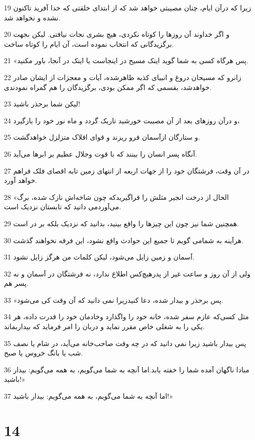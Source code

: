 \par 19 زیرا که درآن ایام، چنان مصیبتی خواهد شد که از ابتدای خلقتی که خدا آفرید تاکنون نشده و نخواهد شد.
\par 20 و اگر خداوند آن روزها را کوتاه نکردی، هیچ بشری نجات نیافتی. لیکن بجهت برگزیدگانی که انتخاب نموده است، آن ایام را کوتاه ساخت.
\par 21 «پس هرگاه کسی به شما گوید اینک مسیح در اینجاست یا اینک در آنجا، باور مکنید.
\par 22 زانرو که مسیحان دروغ و انبیای کذبه ظاهرشده، آیات و معجزات از ایشان صادر خواهدشد، بقسمی که اگر ممکن بودی، برگزیدگان را هم گمراه نمودندی.
\par 23 لیکن شما برحذر باشید!
\par 24 و درآن روزهای بعد از آن مصیبت خورشید تاریک گردد و ماه نور خود را بازگیرد،
\par 25 و ستارگان ازآسمان فرو ریزند و قوای افلاک متزلزل خواهدگشت.
\par 26 آنگاه پسر انسان را بینند که با قوت وجلال عظیم بر ابرها می‌آید.
\par 27 در آن وقت، فرشتگان خود را از جهات اربعه از انتهای زمین تابه اقصای فلک فراهم خواهد آورد.
\par 28 «الحال از درخت انجیر مثلش را فراگیریدکه چون شاخه‌اش نازک شده، برگ می‌آوردمی دانید که تابستان نزدیک است.
\par 29 همچنین شما نیز چون این چیزها را واقع بینید، بدانید که نزدیک بلکه بر در است.
\par 30 هرآینه به شمامی گویم تا جمیع این حوادث واقع نشود، این فرقه نخواهند گذشت.
\par 31 آسمان و زمین زایل می‌شود، لیکن کلمات من هرگز زایل نشود.
\par 32 ولی از آن روز و ساعت غیر از پدرهیچ‌کس اطلاع ندارد، نه فرشتگان در آسمان و نه پسر هم.
\par 33 «پس برحذر و بیدار شده، دعا کنیدزیرا نمی دانید که آن وقت کی می‌شود.
\par 34 مثل کسی‌که عازم سفر شده، خانه خود را واگذارد وخادمان خود را قدرت داده، هر یکی را به شغلی خاص مقرر نماید و دربان را امر فرماید که بیداربماند.
\par 35 پس بیدار باشید زیرا نمی دانید که در چه وقت صاحب‌خانه می‌آید، در شام یا نصف شب یا بانگ خروس یا صبح.
\par 36 مبادا ناگهان آمده شما را خفته یابد.اما آنچه به شما می‌گویم، به همه می‌گویم: بیدار باشید!»
\par 37 اما آنچه به شما می‌گویم، به همه می‌گویم: بیدار باشید!»

\chapter{14}

